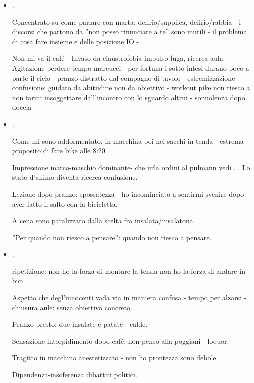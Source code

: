 \begin{itemize}
\item {}.

Concentrato su come parlare con marta: delirio/supplica, delirio/rabbia - i discorsi che partono da ''non posso rinunciare a te'' sono inutili - il problema di cosa fare insieme e delle posizione IO -

Non mi va il caf\'e - Invaso da claustrofobia impulso fuga, ricerca aula - Agitazione perdere tempo marcucci - per fortuna i sotto intesi durano poco a parte il ciclo - pranzo distratto dal compagno di tavolo - estremizzazione confusione: guidato da abitudine non da obiettivo - workout pike non riesco a non farmi insoggettare dall'incontro con lo sguardo altrui - sonnolenza dopo doccia

\item {}.

Come mi sono addormentato: in macchina poi nei sacchi in tenda - estrema - proposito di fare bike  alle 8:20.

Impressione marco-maschio dominante- che urla ordini al pulmann vedi . . Lo stato d'animo diventa ricerca-confusione.

Lezione dopo pranzo: spossatezza - ho incominciato a sentirmi svenire dopo aver fatto il salto con la bicicletta.

A cena sono paralizzato dalla scelta fra insalata/insalatona.

''Per quando non riesco a pensare'':  quando non riesco a pensare.

\item {}.

ripetizione: non ho la forza di montare la tenda-non ho la forza di andare in bici.

Aspetto che degl'innocenti vada via in maniera confusa - tempo per alzarsi - chiusura aule:  senza obiettivo concreto.

Pranzo presto: due insalate e patate - calde.

Sensazione intorpidimento dopo caf\'e: non penso alla poggiani - loquor.

Tragitto in macchina anestetizzato - non ho prontezza sono debole.

Dipendenza-insoferenza dibattiti politici.


\end{itemize}
